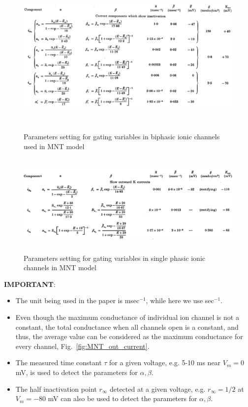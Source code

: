 \begin{figure}[hbt]
  \centerline{\includegraphics[height=8cm,
    angle=0]{./images/MNT_param.eps}}
  \caption{Parameters setting for gating variables in biphasic ionic
    channels used in MNT model}
\label{fig:MNT_param}
\end{figure}

\begin{figure}[hbt]
  \centerline{\includegraphics[height=5cm,
    angle=0]{./images/MNT_param2.eps}}
\caption{Parameters setting for gating variables in single phasic
  ionic channels in MNT model}
\label{fig:MNT_param2}
\end{figure}

{\bf IMPORTANT}:
\begin{itemize}
  \item The unit being used in the paper is msec$^{-1}$, while here we use
  sec$^{-1}$.
\item Even though the maximum conductance of individual ion channel is
  not a constant, the total conductance when all channels open is a
  constant, and thus, the average value can be considered as the
  maximum conductance for every channel,
  Fig.~\ref{fig:MNT_out_current}.
\item The measured time constant $\tau$ for a given voltage, e.g. 5-10
  ms near $V_m=0$ mV, is used to detect the parameters for $\alpha,
  \beta$.
\item The half inactivation point $r_\infty$ detected at a given
  voltage, e.g. $r_\infty =1/2$ at $V_m=-80$ mV can also be used to
  detect the parameters for $\alpha, \beta$.
\end{itemize}

